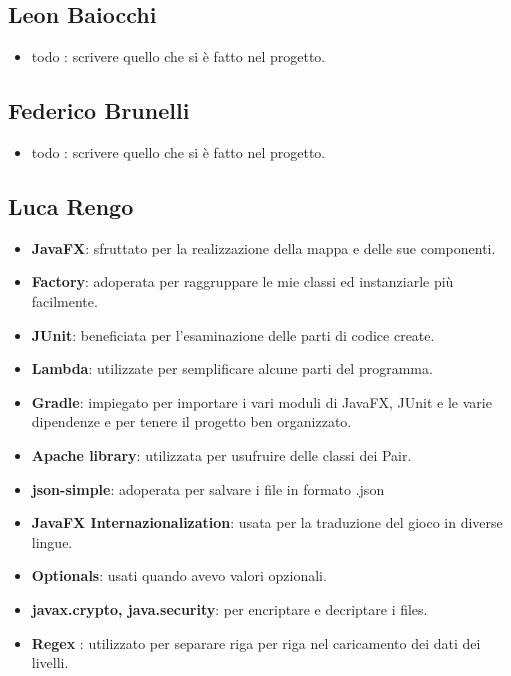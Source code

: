 \subsection*{Leon Baiocchi}

\begin{itemize}
	\item  todo : scrivere quello che si è fatto nel progetto.
\end{itemize}

\subsection*{Federico Brunelli}

\begin{itemize}
	\item  todo : scrivere quello che si è fatto nel progetto.
\end{itemize}

\subsection*{Luca Rengo}

\begin{itemize}
	\item \textsf{\small \textbf{JavaFX}: sfruttato per la realizzazione della mappa e delle sue componenti.}
	\item \textsf{\small \textbf{Factory}: adoperata per raggruppare le mie classi ed instanziarle più facilmente.}
	\item \textsf{\small \textbf{JUnit}: beneficiata per l'esaminazione delle parti di codice create.}
	\item \textsf{\small \textbf{Lambda}: utilizzate per semplificare alcune parti del programma.}
	\item \textsf{\small \textbf{Gradle}: impiegato per importare i vari moduli di JavaFX, JUnit e le varie dipendenze e per tenere il progetto ben organizzato.}
	\item \textsf{\small \textbf{Apache library}: utilizzata per usufruire delle classi dei Pair.}
	\item \textsf{\small \textbf{json-simple}: adoperata per salvare i file in formato .json}
	\item \textsf{\small \textbf{JavaFX Internazionalization}: usata per la traduzione del gioco in diverse lingue.}
	\item \textsf{\small \textbf{Optionals}: usati quando avevo valori opzionali.}
	\item \textsf{\small \textbf{javax.crypto, java.security}: per encriptare e decriptare i files.}
	\item \textsf{\small \textbf{Regex} : utilizzato per separare riga per riga nel caricamento dei dati dei livelli.}
\end{itemize}